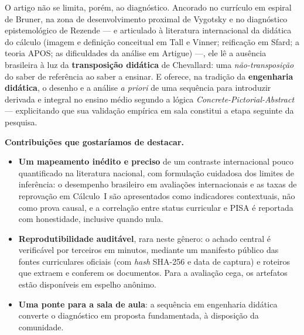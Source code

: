 \documentclass[12pt,a4paper,oneside]{article}
\begin{document}
O artigo não se limita, porém, ao diagnóstico. Ancorado no currículo em
espiral de Bruner, na zona de desenvolvimento proximal de Vygotsky e no
diagnóstico epistemológico de Rezende --- e articulado à literatura
internacional da didática do cálculo (imagem e definição conceitual em Tall e
Vinner; reificação em Sfard; a teoria APOS; as dificuldades da análise em
Artigue) ---, ele lê a ausência brasileira à luz da \textbf{transposição
didática} de Chevallard: uma \textit{não-transposição} do saber de referência
ao saber a ensinar. E oferece, na tradição da \textbf{engenharia didática}, o
desenho e a análise \textit{a priori} de uma sequência para introduzir derivada
e integral no ensino médio segundo a lógica \textit{Concrete-Pictorial-Abstract}
--- explicitando que sua validação empírica em sala constitui a etapa seguinte
da pesquisa.

\medskip
\noindent\textbf{Contribuições que gostaríamos de destacar.}
\begin{itemize}
  \item \textbf{Um mapeamento inédito e preciso} de um contraste internacional
  pouco quantificado na literatura nacional, com formulação cuidadosa dos
  limites de inferência: o desempenho brasileiro em avaliações internacionais e
  as taxas de reprovação em Cálculo~I são apresentados como indicadores
  contextuais, não como prova causal, e a correlação entre status curricular e
  PISA é reportada com honestidade, inclusive quando nula.
  \item \textbf{Reprodutibilidade auditável}, rara neste gênero: o achado
  central é verificável por terceiros em minutos, mediante um manifesto público
  das fontes curriculares oficiais (com \textit{hash} SHA-256 e data de captura)
  e roteiros que extraem e conferem os documentos. Para a avaliação cega, os
  artefatos estão disponíveis em espelho anônimo.
  \item \textbf{Uma ponte para a sala de aula}: a sequência em engenharia
  didática converte o diagnóstico em proposta fundamentada, à disposição da
  comunidade.
\end{itemize}
\end{document}
